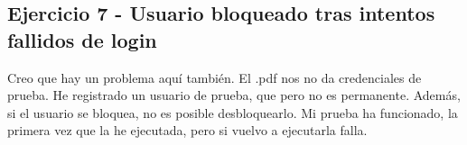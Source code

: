 

\newpage

\subsection{Ejercicio 7 - Usuario bloqueado tras intentos fallidos de login}

Creo que hay un problema aquí también. El .pdf nos no da credenciales de prueba. He registrado un usuario de prueba, que pero no es permanente. Además, si el usuario se bloquea, no es posible desbloquearlo. 
Mi prueba ha funcionado, la primera vez que la he ejecutada, pero si vuelvo a ejecutarla falla.


